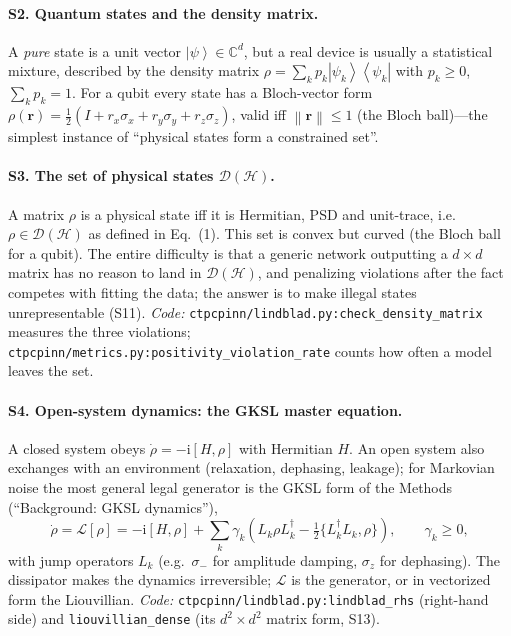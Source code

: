 \documentclass[11pt]{article}
\newcommand{\C}{\mathbb{C}}
\newcommand{\calD}{\mathcal{D}}
\newcommand{\calL}{\mathcal{L}}
\newcommand{\ii}{\mathrm{i}}
\newcommand{\norm}[1]{\left\lVert #1 \right\rVert}
\newcommand{\ket}[1]{\left\lvert #1 \right\rangle}
\newcommand{\bra}[1]{\left\langle #1 \right\rvert}
\newcommand{\proj}[1]{\ket{#1}\!\bra{#1}}
\newcommand{\hilb}{\mathcal{H}}
\begin{document}
\paragraph{S2. Quantum states and the density matrix.}
A \emph{pure} state is a unit vector $\ket{\psi}\in\C^d$, but a real device is usually a statistical mixture, described by the density matrix $\rho=\sum_k p_k\proj{\psi_k}$ with $p_k\ge0$, $\sum_k p_k=1$. For a qubit every state has a Bloch-vector form $\rho(\bm r)=\tfrac12(I+r_x\sigma_x+r_y\sigma_y+r_z\sigma_z)$, valid iff $\norm{\bm r}\le1$ (the Bloch ball)---the simplest instance of ``physical states form a constrained set''.

\paragraph{S3. The set of physical states $\calD(\hilb)$.}
A matrix $\rho$ is a physical state iff it is Hermitian, PSD and unit-trace, i.e.\ $\rho\in\calD(\hilb)$ as defined in Eq.~(1). This set is convex but curved (the Bloch ball for a qubit). The entire difficulty is that a generic network outputting a $d\times d$ matrix has no reason to land in $\calD(\hilb)$, and penalizing violations after the fact competes with fitting the data; the answer is to make illegal states unrepresentable (S11). \emph{Code:} \texttt{ctpcpinn/lindblad.py:check\_density\_matrix} measures the three violations; \texttt{ctpcpinn/metrics.py:positivity\_violation\_rate} counts how often a model leaves the set.

\paragraph{S4. Open-system dynamics: the GKSL master equation.}
A closed system obeys $\dot\rho=-\ii[H,\rho]$ with Hermitian $H$. An open system also exchanges with an environment (relaxation, dephasing, leakage); for Markovian noise the most general legal generator is the GKSL form of the Methods (``Background: GKSL dynamics''),
\begin{equation*}
\dot\rho=\calL[\rho]=-\ii[H,\rho]+\sum_k\gamma_k\!\left(L_k\rho L_k^\dagger-\tfrac12\{L_k^\dagger L_k,\rho\}\right),\qquad \gamma_k\ge0,
\end{equation*}
with jump operators $L_k$ (e.g.\ $\sigma_-$ for amplitude damping, $\sigma_z$ for dephasing). The dissipator makes the dynamics irreversible; $\calL$ is the generator, or in vectorized form the Liouvillian. \emph{Code:} \texttt{ctpcpinn/lindblad.py:lindblad\_rhs} (right-hand side) and \texttt{liouvillian\_dense} (its $d^2\times d^2$ matrix form, S13).
\end{document}
